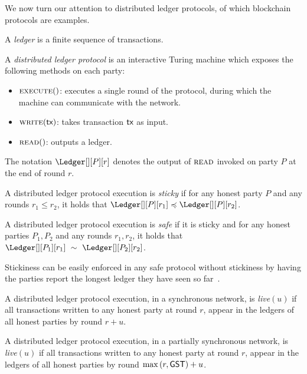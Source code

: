 We now turn our attention to distributed ledger protocols, of which blockchain protocols are examples.

\begin{definition}[Ledger]
  A \emph{ledger} is a finite sequence of transactions.
\end{definition}

\begin{definition}
  A \emph{distributed ledger protocol} is an
  interactive Turing machine which exposes the following
  methods on each party:
  \begin{itemize}
    \item $\textsc{execute}()$: executes a single round of the protocol, during
      which the machine can communicate with the network.
    \item $\textsc{write}(\textsf{tx})$: takes transaction $\textsf{tx}$ as input.
    \item $\textsc{read}()$: outputs a ledger.
  \end{itemize}
\end{definition}

The notation
$\Ledger[][P][r]$ denotes the output of $\textsc{read}$
invoked on party $P$ at the end of round $r$.

\begin{definition}[Stickiness]
  A distributed ledger protocol execution is \emph{sticky} if
  for any honest party $P$ and any rounds $r_1 \leq r_2$,
  it holds that $\Ledger[][P][r_1] \preccurlyeq \Ledger[][P][r_2]$.
\end{definition}

\begin{definition}[Safety]
  A distributed ledger protocol execution is \emph{safe} if it is sticky and
  for any honest parties $P_1, P_2$ and any rounds $r_1, r_2$, it holds that
  $\Ledger[][P_1][r_1]~\sim~\Ledger[][P_2][r_2]$.
\end{definition}

Stickiness can be easily enforced in any safe protocol
without stickiness by having the parties report the longest
ledger they have seen so far~\cite{streamlet}.

\begin{definition}
  A distributed ledger protocol execution, in a synchronous network, is \emph{live}$(u)$ if
  all transactions written to any honest party
  at round $r$, appear in the ledgers of all honest parties by round
  $r + u$.
\end{definition}

\begin{definition}
  A distributed ledger protocol execution, in a partially synchronous network,
  is \emph{live}$(u)$ if all transactions written to any honest party
  at round $r$, appear in the ledgers of all honest parties by round
  $\max{(r,\textsf{GST})} + u$.
\end{definition}